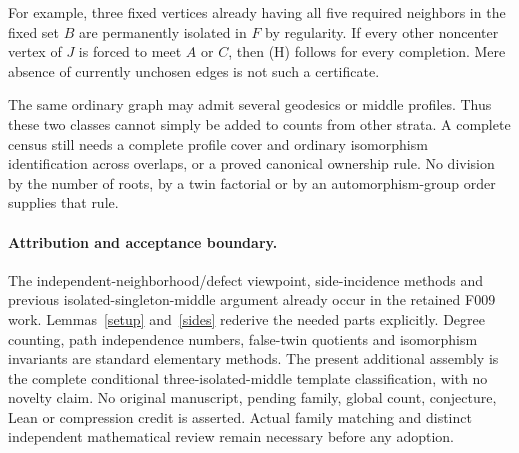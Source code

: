 \documentclass[11pt]{article}
\begin{document}
For example, three fixed vertices already having all five required
neighbors in the fixed set $B$ are permanently isolated in $F$ by
regularity. If every other noncenter vertex of $J$ is forced to meet
$A$ or $C$, then \textup{(H)} follows for every completion. Mere
absence of currently unchosen edges is not such a certificate.

The same ordinary graph may admit several geodesics or middle profiles.
Thus these two classes cannot simply be added to counts from other
strata. A complete census still needs a complete profile cover and
ordinary isomorphism identification across overlaps, or a proved
canonical ownership rule. No division by the number of roots, by a
twin factorial or by an automorphism-group order supplies that rule.

\paragraph{Attribution and acceptance boundary.}
The independent-neighborhood/defect viewpoint, side-incidence methods
and previous isolated-singleton-middle argument already occur in the
retained F009 work. Lemmas~\ref{setup} and~\ref{sides} rederive the
needed parts explicitly. Degree counting, path independence numbers,
false-twin quotients and isomorphism invariants are standard elementary
methods. The present additional assembly is the complete conditional
three-isolated-middle template classification, with no novelty claim.
No original manuscript, pending family, global count, conjecture, Lean
or compression credit is asserted. Actual family matching and distinct
independent mathematical review remain necessary before any adoption.
\end{document}
